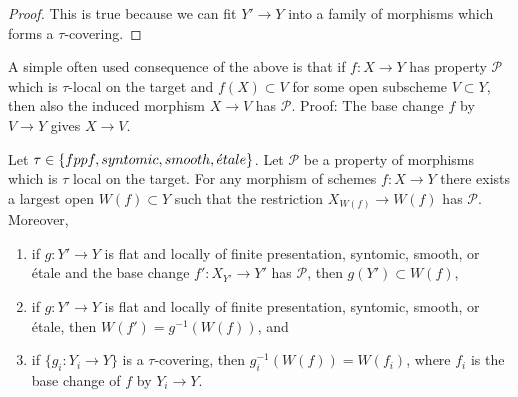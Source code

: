 \begin{proof}
This is true because we can fit $Y' \to Y$ into a family of
morphisms which forms a $\tau$-covering.
\end{proof}

\noindent
A simple often used consequence of the above is that if
$f : X \to Y$ has property $\mathcal{P}$ which is $\tau$-local
on the target and $f(X) \subset V$
for some open subscheme $V \subset Y$, then also the induced
morphism $X \to V$ has $\mathcal{P}$. Proof: The base change
$f$ by $V \to Y$ gives $X \to V$.

\begin{lemma}
\label{lemma-largest-open-of-the-base}
Let $\tau \in \{fppf, syntomic, smooth, {\acute{e}tale}\}$.
Let $\mathcal{P}$ be a property of morphisms which is $\tau$ local
on the target. For any morphism of schemes $f : X \to Y$ there exists
a largest open $W(f) \subset Y$ such that the restriction
$X_{W(f)} \to W(f)$ has $\mathcal{P}$. Moreover,
\begin{enumerate}
\item if $g : Y' \to Y$ is flat and locally of finite presentation,
syntomic, smooth, or \'etale and the base change $f' : X_{Y'} \to Y'$
has $\mathcal{P}$, then $g(Y') \subset W(f)$,
\item if $g : Y' \to Y$ is flat and locally of finite presentation,
syntomic, smooth, or \'etale, then $W(f') = g^{-1}(W(f))$, and
\item if $\{g_i : Y_i \to Y\}$ is a $\tau$-covering, then
$g_i^{-1}(W(f)) = W(f_i)$, where $f_i$ is the base change of $f$
by $Y_i \to Y$.
\end{enumerate}
\end{lemma}


